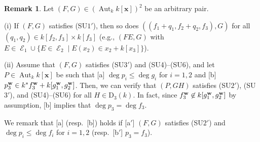 \documentclass{amsart}
\theoremstyle{plain}
\theoremstyle{definition}
\newtheorem{rem}[thm]{Remark}
\newcommand{\E }{{\mathop{\mathcal{E}}\nolimits}}
\newcommand{\Aut }{\mathop{\mathrm{Aut}}\nolimits}
\newcommand{\D }{\mathrm{D}}
\newcommand{\nd}{\noindent}
\newcommand{\x}{{\boldsymbol x}}
\newcommand{\w}{{\bf w}}
\newcommand{\kx}{k[\x]}
\begin{document}
\begin{rem}\label{exc:c1-c6 0}\rm
Let $(F,G)\in (\Aut _k\kx )^2$ be an arbitrary pair. 



\nd (i) 
If $(F,G)$ satisfies (SU$1'$), 
then so does $((f_1+q_1,f_2+q_2,f_3),G)$ 
for all $(q_1,q_2)\in k[f_2,f_3]\times k[f_3]$ 
(e.g., 
$(FE,G)$ with 
$E\in \E _1 \cup \{ E \in \E _2\mid E(x_2)\in x_2+k[x_3]\} $). 



\nd (ii) 
Assume that $(F,G)$ satisfies 
(SU$3'$) and (SU4)--(SU6), 
and let $P\in \Aut _k\kx $ be such that 
[a] $\deg p_i\leq \deg g_i$ for $i=1,2$ and 
[b] $p_3^{\w }\in k^*f_3^{\w }+k[g_1^{\w },g_2^{\w }]$. 
Then, we can verify that $(P,GH)$ satisfies 
(SU$2'$), (SU$3'$), and (SU4)--(SU6) for all $H\in \D _3(k)$. 
In fact, 
since $f_3^{\w }\not\in k[g_1^{\w },g_2^{\w }]$ by assumption, 
[b] implies that $\deg p_3=\deg f_3$. 




We remark that [a] (resp.\ [b]) holds if 
[a$'$] 
$(F,G)$ satisfies (SU$2'$) and $\deg p_i\le \deg f_i$ for $i=1,2$ 
(resp.\ [b$'$] $p_3=f_3$). 
\end{rem}
\end{document}
